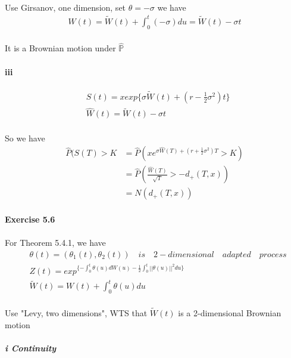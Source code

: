 \documentclass{article}
\begin{document}
\paragraph{}{Use Girsanov, one dimension, set $\theta = -\sigma$ we have}
\begin{align*}
   \hat{W}(t)=\tilde{W}(t)+\int_{0}^{t}(-\sigma)du=\tilde{W}(t)-\sigma t
\end{align*}
\paragraph{}{It is a Brownian motion under $\hat{\mathbb{P}}$}
\paragraph{iii}
\begin{align*}
  &S(t)=xexp\{\sigma\tilde{W}(t)+(r-\frac{1}{2}\sigma^2)t\}  \\
   & \hat{W}(t)=\tilde{W}(t)-\sigma t
\end{align*}
\paragraph{}{So we have \begin{align*}
                          \hat{P}(S(T)>K & =\hat{P}(xe^{\sigma\hat{W}(T)+(r+\frac{1}{2}\sigma^2)T}>K) \\
                           & =\hat{P}(\frac{\hat{W}(T)}{\sqrt{T}}>-d_{+}(T,x))\\
                           &=N(d_{+}(T,x))
                        \end{align*}}
\paragraph{Exercise 5.6}
\paragraph{}{For Theorem 5.4.1, we have}
\begin{align*}
  &\theta(t)=(\theta_1(t),\theta_2(t))\quad is \quad 2-dimensional \quad adapted \quad process  \\
   & Z(t)=exp^{\{-\int_{0}^{t}\theta(u)dW(u)-\frac{1}{2}\int_{0}^{t}||\theta(u)||^2du\}}\\
   &\tilde{W}(t)=W(t)+\int_{0}^{t}\theta(u)du
\end{align*}
\paragraph{}{Use "Levy, two dimensions", WTS that $\tilde{W}(t)$ is a 2-dimensional Brownian motion}
\subparagraph{i Continuity}
\end{document}
